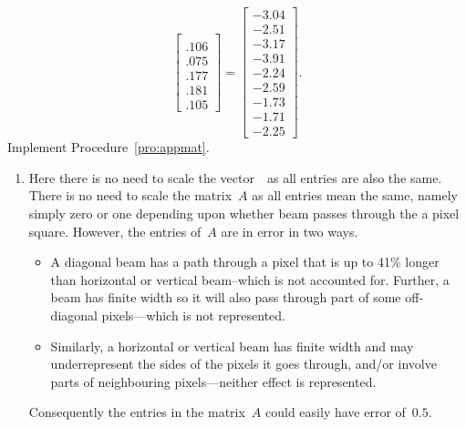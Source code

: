 \begin{example}
\begin{solution}
\begin{equation*}
\begin{bmatrix}
\\ .106
\\ .075
\\ .177
\\ .181
\\ .105 \end{bmatrix}
=\begin{bmatrix} -3.04
\\ -2.51
\\ -3.17
\\ -3.91
\\ -2.24
\\ -2.59
\\ -1.73
\\ -1.71
\\ -2.25 \end{bmatrix}.
\end{equation*}
\setbox\ajrqrbox\hbox{}%
\marginpar{\usebox{\ajrqrbox\\[2ex]}}%
Implement Procedure~\ref{pro:appmat}.
\begin{enumerate}
\item Here there is no need to scale the vector~\bv\ as all entries are also the same.
There is no need to scale the matrix~\(A\) as all entries mean the same, namely simply zero or one depending upon whether  beam passes through the a pixel square.
However, the entries of~\(A\) are in error in two ways.
\begin{itemize}
\item A diagonal beam has a path through a pixel that is up to 41\% longer than horizontal or vertical beam--which is not accounted for.  Further, a beam has finite width so it will also pass through part of some off-diagonal pixels---which is not represented.
\item Similarly, a horizontal or vertical beam has finite width and may underrepresent the sides of the pixels it goes through, and/or involve parts of neighbouring pixels---neither effect is represented.
\end{itemize}
Consequently the entries in the matrix~\(A\) could easily have error of~\(0.5\).


\end{enumerate}
\end{solution}
\end{example}
